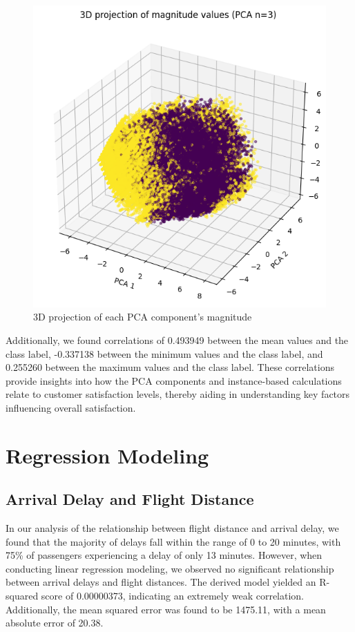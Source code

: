 \documentclass[11pt]{article}
\begin{document}
\begin{figure}[h]
\centering
\includegraphics[width=0.5\linewidth]{project_files/project_38_0.png}
\caption{3D projection of each PCA component's magnitude}
\end{figure}

Additionally, we found correlations of 0.493949 between the mean values and the class label, -0.337138 between the minimum values and the class label, and 0.255260 between the maximum values and the class label. These correlations provide insights into how the PCA components and instance-based calculations relate to customer satisfaction levels, thereby aiding in understanding key factors influencing overall satisfaction.


    
    \hypertarget{question-6}{%
\section{Regression Modeling}\label{question-6}}
\subsection{Arrival Delay and Flight Distance}

In our analysis of the relationship between flight distance and arrival delay, we found that the majority of delays fall within the range of 0 to 20 minutes, with 75\% of passengers experiencing a delay of only 13 minutes. However, when conducting linear regression modeling, we observed no significant relationship between arrival delays and flight distances. The derived model yielded an R-squared score of 0.00000373, indicating an extremely weak correlation. Additionally, the mean squared error was found to be 1475.11, with a mean absolute error of 20.38.
\end{document}
